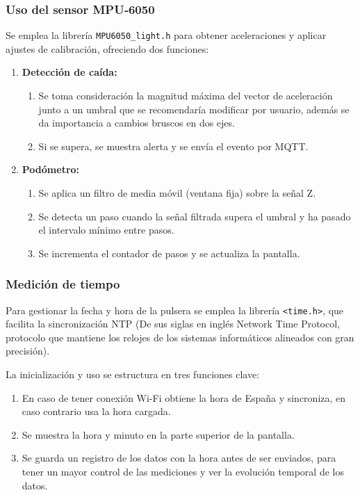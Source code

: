 \documentclass[12pt, a4paper]{article}
\begin{document}
	\subsubsection{Uso del sensor MPU‑6050}
	Se emplea la librería \texttt{MPU6050\_light.h} para obtener aceleraciones y aplicar ajustes de calibración, ofreciendo dos funciones:
	
	\begin{enumerate}
		\item \textbf{Detección de caída:}
		\begin{enumerate}
			\item Se toma consideración la magnitud máxima del vector de aceleración junto a un umbral que se recomendaría modificar por usuario, además se da importancia a cambios bruscos en dos ejes.
			\item Si se supera, se muestra alerta y se envía el evento por MQTT.
		\end{enumerate}
		\item \textbf{Podómetro:}
		\begin{enumerate}
			\item Se aplica un filtro de media móvil (ventana fija) sobre la señal Z.
			\item Se detecta un paso cuando la señal filtrada supera el umbral y ha pasado el intervalo mínimo entre pasos.
			\item Se incrementa el contador de pasos y se actualiza la pantalla.
		\end{enumerate}
	\end{enumerate}
	

	\subsubsection{Medición de tiempo}
	Para gestionar la fecha y hora de la pulsera se emplea la librería \texttt{<time.h>}, que facilita la sincronización NTP (De sus siglas en inglés Network Time Protocol, protocolo que mantiene los relojes de los sistemas informáticos alineados con gran precisión).
	
	La inicialización y uso se estructura en tres funciones clave:
	\begin{enumerate}
		\item En caso de tener conexión Wi-Fi obtiene la hora de España y sincroniza, en caso contrario usa la hora cargada.
		\item Se muestra la hora y minuto en la parte superior de la pantalla.
		\item Se guarda un registro de los datos con la hora antes de ser enviados, para tener un mayor control de las mediciones y ver la evolución temporal de los datos.
	\end{enumerate}
	
\end{document}
